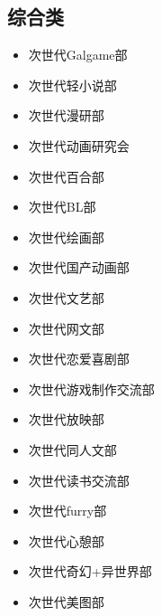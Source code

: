 \documentclass[twoside,12pt]{book}
\newenvironment{categorysection}[1]{
  \subsection*{\textcolor{truepurple}{#1}}
  \begin{itemize}[leftmargin=*, 
                 nosep,               %
                 itemsep=2pt,         %
                 parsep=0pt,          %
                 before=\setlength{\baselineskip}{23pt} %
  ]
}{
  \end{itemize}
}
\begin{document}
\begin{multicols}{3}
    \begin{categorysection}{综合类}
        \item 次世代Galgame部
        \item 次世代轻小说部
        \item 次世代漫研部
        \item 次世代动画研究会
        \item 次世代百合部
        \item 次世代BL部
        \item 次世代绘画部
        \item 次世代国产动画部
        \item 次世代文艺部
        \item 次世代网文部
        \item 次世代恋爱喜剧部
        \item 次世代游戏制作交流部
        \item 次世代放映部
        \item 次世代同人文部
        \item 次世代读书交流部
        \item 次世代furry部
        \item 次世代心憩部
        \item 次世代奇幻+异世界部
        \item 次世代美图部
    \end{categorysection}


\end{multicols}
\end{document}
